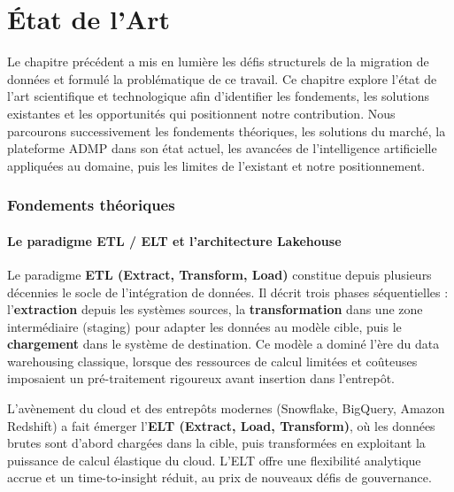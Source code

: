 \chapter{État de l'Art}
\label{sec:etat-art}

Le chapitre précédent a mis en lumière les défis structurels de la migration
de données et formulé la problématique de ce travail. Ce chapitre explore
l'état de l'art scientifique et technologique afin d'identifier les fondements,
les solutions existantes et les opportunités qui positionnent notre contribution.
Nous parcourons successivement les fondements théoriques, les solutions du
marché, la plateforme ADMP dans son état actuel, les avancées de l'intelligence
artificielle appliquées au domaine, puis les limites de l'existant et notre
positionnement.

\subsection{Fondements théoriques}
\label{subsec:fondements}

\subsubsection{Le paradigme ETL / ELT et l'architecture Lakehouse}
\label{subsubsec:etl-elt}

Le paradigme \textbf{ETL (Extract, Transform, Load)} constitue depuis plusieurs
décennies le socle de l'intégration de données. Il décrit trois phases
séquentielles : l'\textbf{extraction} depuis les systèmes sources, la
\textbf{transformation} dans une zone intermédiaire (staging) pour adapter les
données au modèle cible, puis le \textbf{chargement} dans le système de
destination. Ce modèle a dominé l'ère du data warehousing classique, lorsque
des ressources de calcul limitées et coûteuses imposaient un pré-traitement
rigoureux avant insertion dans l'entrepôt.

L'avènement du cloud et des entrepôts modernes (Snowflake, BigQuery, Amazon
Redshift) a fait émerger l'\textbf{ELT (Extract, Load, Transform)}, où les
données brutes sont d'abord chargées dans la cible, puis transformées en
exploitant la puissance de calcul élastique du cloud. L'ELT offre une
flexibilité analytique accrue et un time-to-insight réduit, au prix de nouveaux
défis de gouvernance.

